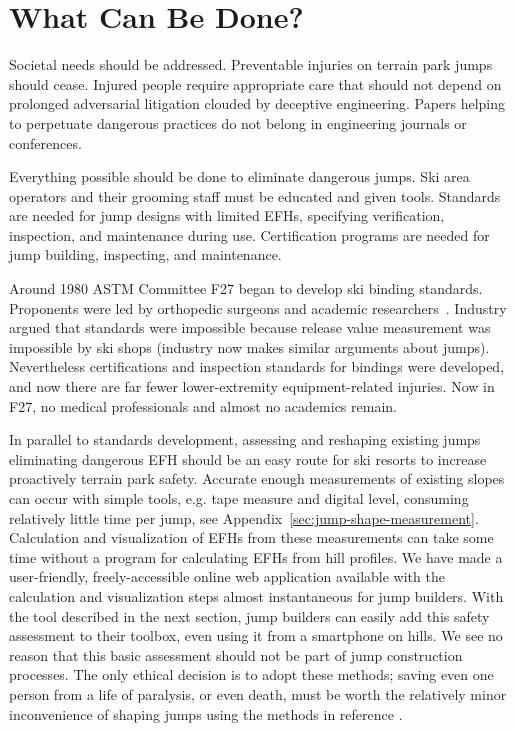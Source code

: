 \documentclass[smallextended]{svjour3}       %
\begin{document}
\section{What Can Be Done?}
\label{sec:action}
%
Societal needs should be addressed. Preventable injuries on terrain park jumps
should cease. Injured people require appropriate care that should not depend on
prolonged adversarial litigation clouded by deceptive engineering. Papers
helping to perpetuate dangerous practices do not belong in engineering journals
or conferences.

Everything possible should be done to eliminate dangerous jumps. Ski area
operators and their grooming staff must be educated and given tools. Standards
are needed for jump designs with limited EFHs, specifying verification,
inspection, and maintenance during use. Certification programs are needed for
jump building, inspecting, and maintenance.

Around 1980 ASTM Committee F27 began to develop ski binding standards.
Proponents were led by orthopedic surgeons and academic
researchers~\cite{Bahniuk1996}.  Industry argued that standards were impossible
because release value measurement was impossible by ski shops (industry now
makes similar arguments about jumps). Nevertheless certifications and
inspection standards for bindings were developed, and now there are far fewer
lower-extremity equipment-related injuries. Now in F27, no medical
professionals and almost no academics remain.

In parallel to standards development, assessing and reshaping existing jumps
eliminating dangerous EFH should be an easy route for ski resorts to increase
proactively terrain park safety. Accurate enough measurements of existing
slopes can occur with simple tools, e.g. tape measure and digital level,
consuming relatively little time per jump, see
Appendix~\ref{sec:jump-shape-measurement}. Calculation and visualization of
EFHs from these measurements can take some time without a program for
calculating EFHs from hill profiles. We have made a user-friendly,
freely-accessible online web application available with the calculation and
visualization steps almost instantaneous for jump builders. With the tool
described in the next section, jump builders can easily add this safety
assessment to their toolbox, even using it from a smartphone on hills.  We see
no reason that this basic assessment should not be part of jump construction
processes. The only ethical decision is to adopt these methods; saving even one
person from a life of paralysis, or even death, must be worth the relatively
minor inconvenience of shaping jumps using the methods in reference
\cite{Levy2015}.
\end{document}
